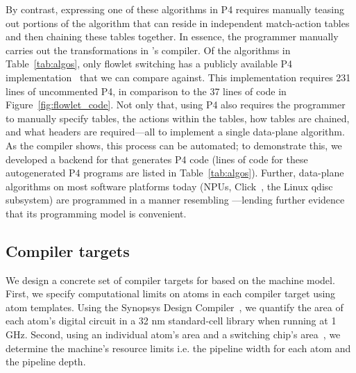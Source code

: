 By contrast, expressing one of these algorithms in P4 requires manually teasing
out portions of the algorithm that can reside in independent match-action
tables and then chaining these tables together. In essence, the programmer
manually carries out the transformations in \pktlanguage's compiler. Of the
algorithms in Table~\ref{tab:algos}, only flowlet switching has a publicly
available P4 implementation~\cite{p4_flowlet} that we can compare against. This
implementation requires 231 lines of uncommented P4, in comparison to the 37
lines of \pktlanguage code in Figure~\ref{fig:flowlet_code}. Not only that,
using P4 also requires the programmer to manually specify tables, the actions
within the tables, how tables are chained, and what headers are required---all
to implement a single data-plane algorithm. As the \pktlanguage compiler shows,
this process can be automated; to demonstrate this, we developed a backend for
\pktlanguage that generates P4 code (lines of code for these autogenerated P4
programs are listed in Table~\ref{tab:algos}). Further, data-plane algorithms
on most software platforms today (NPUs, Click~\cite{click}, the Linux qdisc
subsystem)  are programmed in a manner resembling \pktlanguage---lending
further evidence that its programming model is convenient.

\subsection{Compiler targets}
\label{ss:targets}

We design a concrete set of compiler targets for \pktlanguage based on the
\absmachine machine model. First, we specify computational limits on atoms in
each compiler target using atom templates. Using the Synopsys Design
Compiler~\cite{synopsys_dc}, we quantify the area of each atom's digital
circuit in a 32 nm standard-cell library when running at 1 GHz.  Second, using
an individual atom's area and a switching chip's area~\cite{gibb_parsing}, we
determine the machine's resource limits i.e. the pipeline width for each atom
and the pipeline depth.

